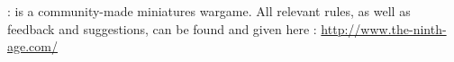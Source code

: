 \begin{titlepage}
\begin{center}
\end{center}

\newpage

\thispagestyle{empty}

{\fontsize{12}{14.4}\selectfont

 :  is a community-made miniatures wargame. All relevant rules, as well as feedback and suggestions, can be found and given here :
\newline\url{http://www.the-ninth-age.com/}


\vfill

}


\end{titlepage}

\restoregeometry